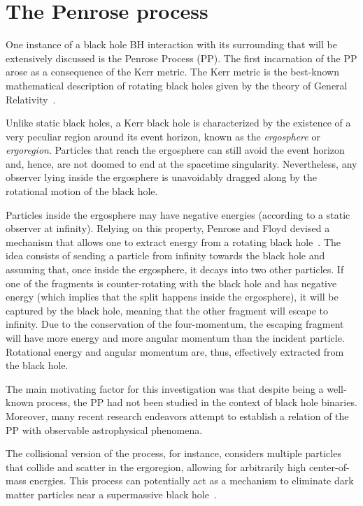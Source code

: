 \section*{The Penrose process}

One instance of a black hole \ac{BH} interaction with its surrounding that will be extensively discussed is the Penrose Process (\ac{PP}). The first incarnation of the \ac{PP} arose as a consequence of the Kerr metric. The Kerr metric is the best-known mathematical description of rotating black holes given by the theory of General Relativity~\cite{Visser:2007fj,Bambi:2011mj,Teukolsky:2014vca,berti}.

Unlike static black holes, a Kerr black hole is characterized by the existence of a very peculiar region around its event horizon, known as the \emph{ergosphere} or \emph{ergoregion}. Particles that reach the ergosphere can still avoid the event horizon and, hence, are not doomed to end at the spacetime singularity. Nevertheless, any observer lying inside the ergosphere is unavoidably dragged along by the rotational motion of the black hole.

Particles inside the ergosphere may have negative energies (according to a static observer at infinity). Relying on this property, Penrose and Floyd devised a mechanism that allows one to extract energy from a rotating black hole~\cite{PENROSE1971}. The idea consists of sending a particle from infinity towards the black hole and assuming that, once inside the ergosphere, it decays into two other particles. If one of the fragments is counter-rotating with the black hole and has negative energy (which implies that the split happens inside the ergosphere), it will be captured by the black hole, meaning that the other fragment will escape to infinity. Due to the conservation of the four-momentum, the escaping fragment will have more energy and more angular momentum than the incident particle. Rotational energy and angular momentum are, thus, effectively extracted from the black hole.

The main motivating factor for this investigation was that despite being a well-known process, the \ac{PP} had not been studied in the context of black hole binaries. Moreover, many recent research endeavors attempt to establish a relation of the \ac{PP} with observable astrophysical phenomena.

The collisional version of the process, for instance, considers multiple particles that collide and scatter in the ergoregion, allowing for arbitrarily high center-of-mass energies. This process can potentially act as a mechanism to eliminate dark matter particles near a supermassive black hole~\cite{Schnittman:2018ccg}.

